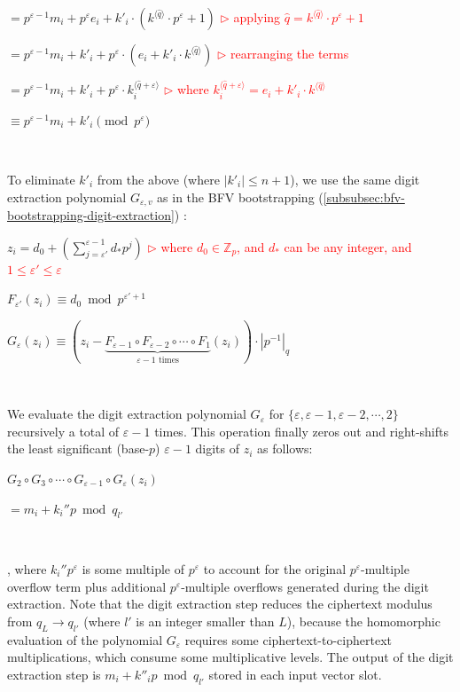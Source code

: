 \begin{enumerate}
$ = p^{\varepsilon-1} m_i + p^\varepsilon e_i + k'_i\cdot(k^{\langle \hat{q} \rangle } \cdot p^\varepsilon + 1) $  \textcolor{red}{ $\rhd$ applying $\hat{q} = k^{\langle \hat{q} \rangle } \cdot p^\varepsilon + 1$}

$ = p^{\varepsilon-1} m_i + k'_i + p^\varepsilon  \cdot (e_i + k'_i\cdot k^{\langle \hat{q} \rangle }) $ \textcolor{red}{ $\rhd$ rearranging the terms}

$ = p^{\varepsilon-1} m_i + k'_i + p^\varepsilon \cdot k_i^{\langle \hat{q} + \varepsilon \rangle } $ \textcolor{red}{ $\rhd$ where $ k_i^{\langle \hat{q} + \varepsilon \rangle } = e_i + k'_i\cdot k^{\langle \hat{q} \rangle } $}

$ \equiv p^{\varepsilon-1} m_i + k'_i \pmod{p^\varepsilon}$

$ $

To eliminate $k'_i$ from the above (where $|k'_i| \leq n + 1$), we use the same digit extraction polynomial $G_{\varepsilon, v}$ as in the BFV bootstrapping (\autoref{subsubsec:bfv-bootstrapping-digit-extraction}) :

$z_i = d_0 + \left(\sum\limits_{j=\varepsilon'}^{\varepsilon-1} d_* p^j\right)$ \textcolor{red}{ $\rhd$ where $d_0 \in \mathbb{Z}_p$, \text{ } and $d_*$ can be any integer, \text{ } and $1 \leq \varepsilon' \leq \varepsilon$}

$F_{\varepsilon'}(z_i) \equiv d_0 \bmod p^{\varepsilon'+1}$

$G_{\varepsilon}(z_i) \equiv (z_i - \underbrace{F_{\varepsilon-1} \circ F_{\varepsilon-2} \circ \cdots \circ F_1}_{\varepsilon - 1 \text{ times}} (z_i)) \cdot |p^{-1}|_{q}$

$ $

We evaluate the digit extraction polynomial $G_{\varepsilon}$ for $\{\varepsilon, \varepsilon-1, \varepsilon-2, \cdots, 2\}$ recursively a total of $\varepsilon-1$ times. This operation finally zeros out and right-shifts the least significant (base-$p$) $\varepsilon-1$ digits of $z_i$ as follows:

$G_{2} \circ G_{3} \circ \cdots \circ G_{\varepsilon-1} \circ G_{\varepsilon} (z_i)$

$= m_i + k_i''p \bmod q_{l'}$

$ $

, where $k_i''p^\varepsilon$ is some multiple of $p^\varepsilon$ to account for the original $p^\varepsilon$-multiple overflow term plus additional $p^\varepsilon$-multiple overflows generated during the digit extraction. Note that the digit extraction step reduces the ciphertext modulus from $q_L \rightarrow q_{l'}$ (where $l'$ is an integer smaller than $L$), because the homomorphic evaluation of the polynomial $G_{\varepsilon}$ requires some ciphertext-to-ciphertext multiplications, which consume some multiplicative levels. The output of the digit extraction step is $m_i + k''_ip \bmod q_{l'}$ stored in each input vector slot. 


\end{enumerate}
